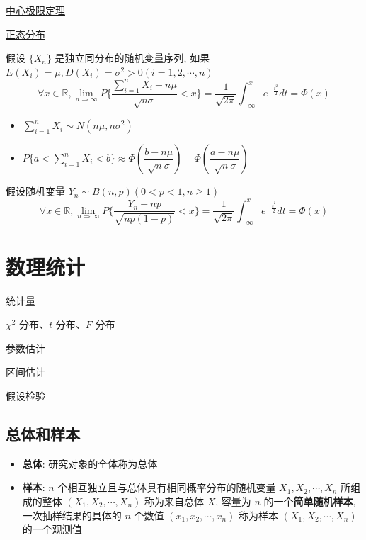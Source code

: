 \href{https://www.bilibili.com/video/BV1gh4y1W7ag/?spm_id_from=333.999.list.card_archive.click}{中心极限定理}

\href{https://www.bilibili.com/video/BV1wu411W7uU/?spm_id_from=333.999.list.card_archive.click}{正态分布}

\begin{theorem}[列维-林德伯格定理]
	假设 $\{X_{n}\}$ 是独立同分布的随机变量序列, 如果 $E(X_{i}) = \mu, D(X_{i}) = \sigma^2 > 0(i = 1,2,\cdots,n)$
	$$\forall x \in \mathbb{R}, \lim\limits_{n\Rightarrow \infty}P\{\dfrac{\sum\limits_{i=1}^{n}X_{i}-n\mu}{\sqrt{n\sigma}}<x\} = \dfrac{1}{\sqrt{2\pi}}\int_{-\infty}^{x}e^{-\frac{t^2}{2}}dt=\varPhi(x)$$
\end{theorem}
\begin{corollary}[中心极限定理推论]
	\begin{itemize}
		\item $\sum\limits_{i = 1}^{n}X_{i}\sim N(n\mu,n\sigma^2)$
		\item $P\{a<\sum\limits_{i=1}^{n}X_{i}<b\}\approx\varPhi(\dfrac{b-n\mu}{\sqrt{n}\sigma})-\varPhi(\dfrac{a-n\mu}{\sqrt{n}\sigma})$
	\end{itemize}
\end{corollary}

\begin{theorem}
	假设随机变量 $Y_{n}\sim B(n,p)(0 < p < 1, n\geq 1)$
	$$\forall x\in \mathbb{R}, \lim\limits_{n\Rightarrow \infty}P\{\dfrac{Y_{n}-np}{\sqrt{np(1-p)}}<x\}=\dfrac{1}{\sqrt{2\pi}}\int_{-\infty}^{x}e^{-\frac{t^2}{2}}dt = \varPhi(x)$$
\end{theorem}

\chapter{数理统计}
\begin{introduction}
	\item 统计量
	\item $\chi^{2}$ 分布、$t$ 分布、$F$ 分布
	\item 参数估计
	\item 区间估计
	\item 假设检验
\end{introduction}
\section{总体和样本}
\begin{definition}[统计概念和统计量]
	\begin{itemize}
		\item \textbf{总体}: 研究对象的全体称为总体
		\item \textbf{样本}: $n$ 个相互独立且与总体具有相同概率分布的随机变量 $X_{1}, X_{2}, \cdots, X_{n}$ 所组成的整体 $(X_{1}, X_{2}, \cdots, X_{n})$ 
		称为来自总体 $X$, 容量为 $n$ 的一个\textbf{简单随机样本}, 一次抽样结果的具体的 $n$ 个数值 $(x_{1},x_{2},\cdots,x_{n})$ 称为样本 $(X_{1},X_{2},\cdots,X_{n})$ 的一个观测值
	\end{itemize}
\end{definition}

